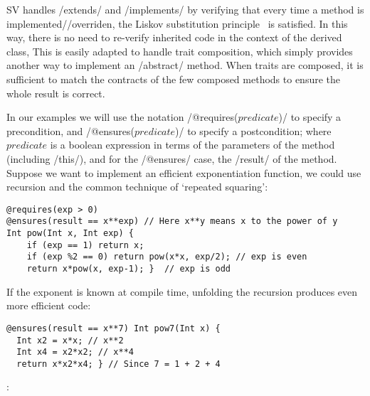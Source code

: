 SV handles /extends/ and /implements/ by verifying that every 
time a method is implemented//overriden, 
the Liskov substitution principle~\cite{Liskov:1994:BNS:197320.197383} is satisfied. In this way, there is no need to re-verify
inherited code in the context of the derived class, 
This is easily adapted
to handle trait composition, which simply provides another way to implement an /abstract/ method.
When traits are composed,
it is sufficient
to match the contracts of the few composed methods
to ensure the whole result is correct.

In our examples we will use the notation /@requires($predicate$)/ 
to specify a precondition, and /@ensures($predicate$)/ 
to specify a postcondition; where $predicate$ is a boolean expression
in terms of the parameters of the method (including /this/), and for the /@ensures/ case, the /result/ of the method.
Suppose we want to implement an efficient exponentiation function, we could use recursion and the common technique of `repeated squaring':
\vspace{-1ex}
\begin{lstlisting}
@requires(exp > 0)
@ensures(result == x**exp) // Here x**y means x to the power of y
Int pow(Int x, Int exp) {
	if (exp == 1) return x;
	if (exp %2 == 0) return pow(x*x, exp/2); // exp is even
	return x*pow(x, exp-1); }  // exp is odd
\end{lstlisting}
If the exponent is known at compile time,
unfolding the recursion produces even more efficient code:
\vspace{-1ex}
\begin{lstlisting}[firstnumber=7]
@ensures(result == x**7) Int pow7(Int x) { 
  Int x2 = x*x; // x**2
  Int x4 = x2*x2; // x**4
  return x*x2*x4; } // Since 7 = 1 + 2 + 4
\end{lstlisting}
\vspace{-1ex}
:
